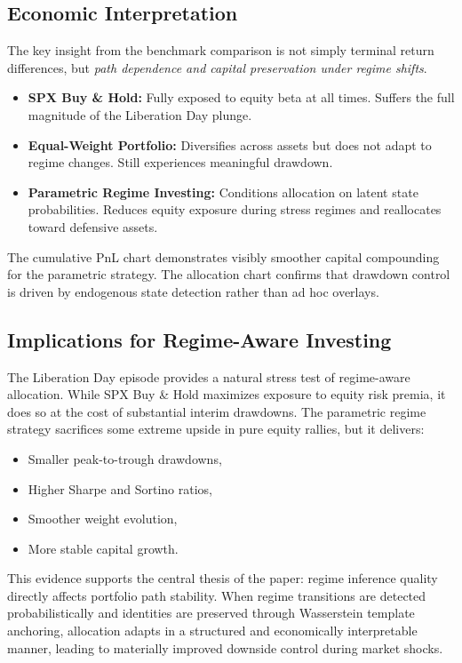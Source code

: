 \documentclass[11pt]{article}
\begin{document}
\subsection{Economic Interpretation}

The key insight from the benchmark comparison is not simply terminal return differences,
but \emph{path dependence and capital preservation under regime shifts}.

\begin{itemize}
    \item \textbf{SPX Buy \& Hold:} Fully exposed to equity beta at all times. Suffers the full magnitude of the Liberation Day plunge.
    \item \textbf{Equal-Weight Portfolio:} Diversifies across assets but does not adapt to regime changes. Still experiences meaningful drawdown.
    \item \textbf{Parametric Regime Investing:} Conditions allocation on latent state probabilities. Reduces equity exposure during stress regimes and reallocates toward defensive assets.
\end{itemize}
The cumulative PnL chart demonstrates visibly smoother capital compounding for the parametric strategy.
The allocation chart confirms that drawdown control is driven by endogenous state detection rather than ad hoc overlays.

\subsection{Implications for Regime-Aware Investing}

The Liberation Day episode provides a natural stress test of regime-aware allocation.
While SPX Buy \& Hold maximizes exposure to equity risk premia,
it does so at the cost of substantial interim drawdowns.
The parametric regime strategy sacrifices some extreme upside in pure equity rallies,
but it delivers:
\begin{itemize}
    \item Smaller peak-to-trough drawdowns,
    \item Higher Sharpe and Sortino ratios,
    \item Smoother weight evolution,
    \item More stable capital growth.
\end{itemize}
This evidence supports the central thesis of the paper:
regime inference quality directly affects portfolio path stability.
When regime transitions are detected probabilistically and identities are preserved through Wasserstein template anchoring,
allocation adapts in a structured and economically interpretable manner,
leading to materially improved downside control during market shocks.
\end{document}

